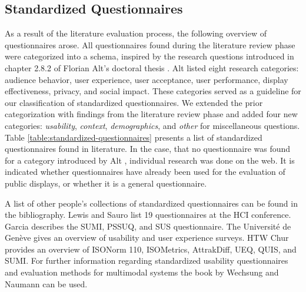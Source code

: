 \subsection{Standardized Questionnaires}
\label{section:questionnaires:categorization}


	As a result of the literature evaluation process, the following overview of questionnaires arose. All questionnaires found during the literature review phase were categorized into a schema, inspired by the research questions introduced in chapter 2.8.2 of Florian Alt's doctoral thesis \cite{alt2013thesis}. Alt listed eight research categories: audience behavior, user experience, user acceptance, user performance, display effectiveness, privacy, and social impact. These categories served as a guideline for our classification of standardized questionnaires. We extended the prior categorization with findings from the literature review phase and added four new categories: \textit{usability}, \textit{context}, \textit{demographics}, and \textit{other} for miscellaneous questions.	Table \ref{table:standardized-questionnaires} presents a list of standardized questionnaires found in literature. In the case, that no questionnaire was found for a category introduced by Alt \cite{alt2013thesis}, individual research was done on the web. It is indicated whether questionnaires have already been used for the evaluation of public displays, or whether it is a general questionnaire.

	A list of other people's collections of standardized questionnaires can be found in the bibliography. Lewis and Sauro \cite{Lewis2013HCI} list 19 questionnaires at the HCI conference. Garcia \cite{Garcia2013UXResearch} describes the SUMI, PSSUQ, and SUS questionnaire. The Universit{\'e} de Gen{\`e}ve \cite{Geneve2014Wiki} gives an overview of usability and user experience surveys. HTW Chur \cite{Chur2014Questionnaires} provides an overview of ISONorm 110, ISOMetrics, AttrakDiff, UEQ, QUIS, and SUMI. For further information regarding standardized usability questionnaires and evaluation methods for multimodal systems the book by Wechsung and Naumann \cite{wechsung2008evaluation} can be used. 




